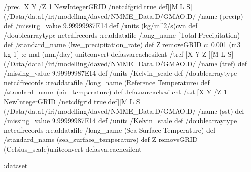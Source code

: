 \begin{ingrid}
/prec{
 [X Y /Z 1 NewIntegerGRID /netcdfgrid true def][M L S] (/Data/data1/iri/modelling/daved/NMME_Data.D/GMAO.D/%
/name (precip) def
 /missing_value 9.99999987E14 def
 /units (kg/m^2/s)cvn def
 /doublearraytype netcdfrecords :readdatafile
/long_name (Total Precipitation) def
/standard_name (lwe_precipitation_rate) def
Z removeGRID
c: 0.001 (m3 kg-1) :c
mul (mm/day) unitconvert
}defasvarcachesilent
/tref{
 [X Y Z ][M L S] (/Data/data1/iri/modelling/daved/NMME_Data.D/GMAO.D/%
/name (tref) def
 /missing_value 9.99999987E14 def
 /units /Kelvin_scale def
 /doublearraytype netcdfrecords :readdatafile
/long_name (Reference Temperature) def
/standard_name (air_temperature) def
}defasvarcachesilent
/sst{
 [X Y /Z 1 NewIntegerGRID /netcdfgrid true def][M L S] (/Data/data1/iri/modelling/daved/NMME_Data.D/GMAO.D/%
/name (sst) def
 /missing_value 9.99999987E14 def
 /units /Kelvin_scale def
 /doublearraytype netcdfrecords :readdatafile
/long_name (Sea Surface Temperature) def
/standard_name (sea_surface_temperature) def
Z removeGRID
(Celsius_scale)unitconvert
}defasvarcachesilent
\end{ingrid}
\begin{ingrid}
:dataset
\end{ingrid}
